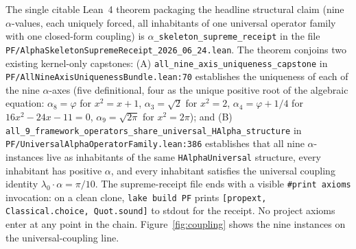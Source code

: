 \documentclass[11pt,a4paper]{amsart}
\theoremstyle{plain}
\theoremstyle{definition}
\begin{document}
The single citable Lean~4 theorem packaging the headline structural claim (nine $\alpha$-values, each uniquely forced, all inhabitants of one universal operator family with one closed-form coupling) is \texttt{$\alpha$\_skeleton\_supreme\_receipt} in the file \texttt{PF/AlphaSkeletonSupremeReceipt\_2026\_06\_24.lean}. The theorem conjoins two existing kernel-only capstones: (A) \texttt{all\_nine\_axis\_uniqueness\_capstone} in \texttt{PF/AllNineAxisUniquenessBundle.lean:70} establishes the uniqueness of each of the nine $\alpha$-axes (five definitional, four as the unique positive root of the algebraic equation: $\alpha_8=\varphi$ for $x^2=x+1$, $\alpha_3=\sqrt{2}$ for $x^2=2$, $\alpha_4=\varphi+1/4$ for $16x^2-24x-11=0$, $\alpha_9=\sqrt{2\pi}$ for $x^2=2\pi$); and (B) \texttt{all\_9\_framework\_operators\_share\_universal\_HAlpha\_structure} in \texttt{PF/UniversalAlphaOperatorFamily.lean:386} establishes that all nine $\alpha$-instances live as inhabitants of the same \texttt{HAlphaUniversal} structure, every inhabitant has positive $\alpha$, and every inhabitant satisfies the universal coupling identity $\lambda_0 \cdot \alpha = \pi/10$. The supreme-receipt file ends with a visible \texttt{\#print axioms} invocation: on a clean clone, \texttt{lake build PF} prints \texttt{[propext, Classical.choice, Quot.sound]} to stdout for the receipt. No project axioms enter at any point in the chain. Figure~\ref{fig:coupling} shows the nine instances on the universal-coupling line.
\end{document}
